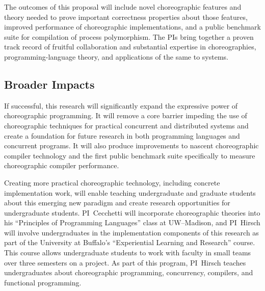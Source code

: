 The outcomes of this proposal will include novel choreographic features and theory needed to prove
important correctness properties about those features, improved performance of choreographic implementations,
and a public benchmark suite for compilation of process polymorphism.
The PIs bring together a proven track record of fruitful collaboration
and substantial expertise in choreographies, programming-language theory, and applications of the same to systems.

\subsection*{Broader Impacts}

If successful, this research will significantly expand the expressive power of choreographic programming.
It will remove a core barrier impeding the use of choreographic techniques for practical concurrent and distributed systems
and create a foundation for future research in both programming languages and concurrent programs.
It will also produce improvements to nascent choreographic compiler technology
and the first public benchmark suite specifically to measure choreographic compiler performance.

Creating more practical choreographic technology, including concrete implementation work,
will enable teaching undergraduate and graduate students about this emerging new paradigm
and create research opportunities for undergraduate students.
PI~Cecchetti will incorporate choreographic theories into his ``Principles of Programming Languages'' class at UW--Madison,
and PI~Hirsch will involve undergraduates in the implementation components of this research as part of the University at Buffalo's ``Experiential Learning and Research'' course.
This course allows undergraduate students to work with faculty in small teams over three semesters on a project.
As part of this program, PI~Hirsch teaches undergraduates about choreographic programming, concurrency, compilers, and functional programming.




